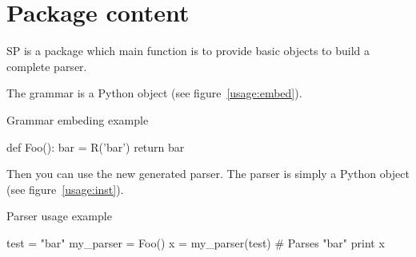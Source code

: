 \section{Package content}

SP is a package which main function is to provide basic objects to build a complete parser.

The grammar is a Python object (see figure~\ref{usage:embed}).

\begin{code}
\caption{Grammar embeding example}                          \label{usage:embed}
\begin{verbatimtab}[4]
    def Foo():
        bar = R('bar')
        return bar
\end{verbatimtab}
\end{code}

Then you can use the new generated parser. The parser is simply a Python object (see figure~\ref{usage:inst}).

\begin{code}
\caption{Parser usage example}                              \label{usage:inst}
\begin{verbatimtab}[4]
    test = "bar"
    my_parser = Foo()
    x = my_parser(test)               # Parses "bar"
    print x
\end{verbatimtab}
\end{code}

